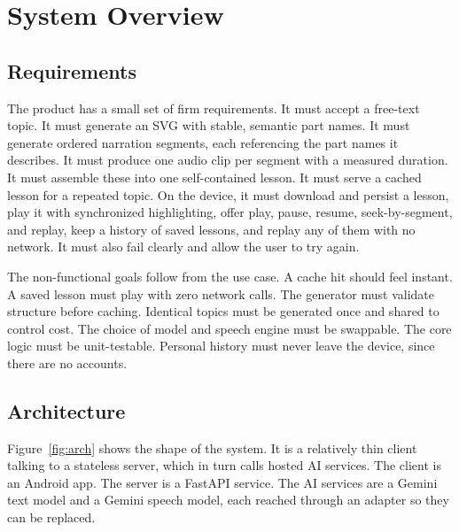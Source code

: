 \documentclass[conference]{IEEEtran}
\begin{document}
\section{System Overview}
\label{sec:overview}

\subsection{Requirements}
The product has a small set of firm requirements. It must accept a free-text
topic. It must generate an SVG with stable, semantic part names. It must
generate ordered narration segments, each referencing the part names it
describes. It must produce one audio clip per segment with a measured duration.
It must assemble these into one self-contained lesson. It must serve a cached
lesson for a repeated topic. On the device, it must download and persist a
lesson, play it with synchronized highlighting, offer play, pause, resume,
seek-by-segment, and replay, keep a history of saved lessons, and replay any of
them with no network. It must also fail clearly and allow the user to try
again.

The non-functional goals follow from the use case. A cache hit should feel
instant. A saved lesson must play with zero network calls. The generator must
validate structure before caching. Identical topics must be generated once and
shared to control cost. The choice of model and speech engine must be swappable.
The core logic must be unit-testable. Personal history must never leave the
device, since there are no accounts.

\subsection{Architecture}
Figure~\ref{fig:arch} shows the shape of the system. It is a relatively thin
client talking to a stateless server, which in turn calls hosted AI services. The
client is an Android app. The server is a FastAPI service. The AI services are a
Gemini text model and a Gemini speech model, each reached through an adapter so
they can be replaced.
\end{document}
